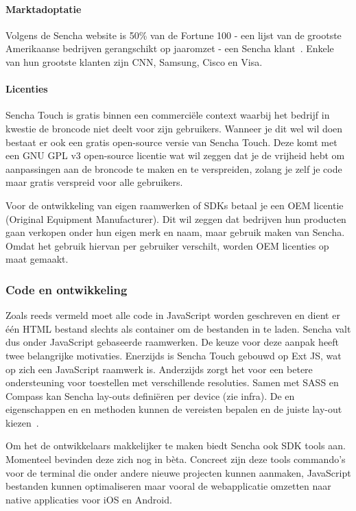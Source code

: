 \paragraph{Marktadoptatie}
Volgens de Sencha website is 50\% van de Fortune 100 - een lijst van de grootste Amerikaanse bedrijven gerangschikt op jaaromzet - een Sencha klant~\cite{Inc.}.  Enkele van hun grootste klanten zijn CNN,  Samsung,  Cisco en  Visa.

\paragraph{Licenties}
Sencha Touch is gratis binnen een commerciële context waarbij het bedrijf in kwestie de broncode niet deelt voor zijn gebruikers.  Wanneer je dit wel wil doen bestaat er ook een gratis open-source versie van Sencha Touch.  Deze komt met een GNU GPL v3 open-source licentie wat wil zeggen dat je de vrijheid hebt om aanpassingen aan de broncode te maken en te verspreiden,  zolang je zelf je code maar gratis verspreid voor alle gebruikers.
  
Voor de ontwikkeling van eigen raamwerken of SDKs betaal je een OEM licentie (Original Equipment Manufacturer).  Dit wil zeggen dat bedrijven hun producten gaan verkopen onder hun eigen merk en naam, maar gebruik maken van Sencha.  Omdat het gebruik hiervan per gebruiker verschilt,  worden OEM licenties op maat gemaakt.

\subsubsection{Code en ontwikkeling}
Zoals reeds vermeld moet alle code in JavaScript worden geschreven en dient er één HTML bestand slechts als container om de bestanden in te laden.  Sencha valt dus onder JavaScript gebaseerde raamwerken.  De keuze voor deze aanpak heeft twee belangrijke motivaties.  Enerzijds is Sencha Touch gebouwd op Ext JS,  wat op zich een JavaScript raamwerk is.  Anderzijds zorgt het voor een betere ondersteuning voor toestellen met verschillende resoluties.  Samen met SASS en Compass kan Sencha lay-outs definiëren per device (zie infra).  De  en  eigenschappen en  en  methoden kunnen de vereisten bepalen en de juiste lay-out kiezen~\cite{JohnEClark2012}.

Om het de ontwikkelaars makkelijker te maken biedt Sencha ook SDK tools aan.  Momenteel bevinden deze zich nog in bèta.  Concreet zijn deze tools commando's voor de terminal die onder andere nieuwe projecten kunnen aanmaken, JavaScript bestanden kunnen optimaliseren maar vooral de webapplicatie omzetten naar native applicaties voor iOS en Android.

